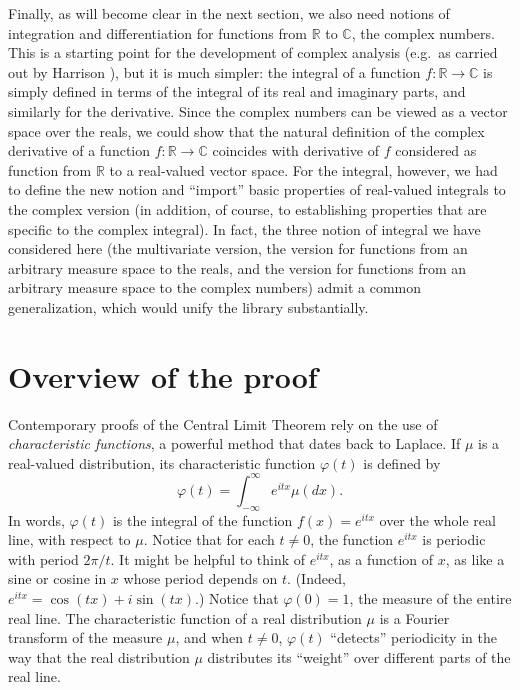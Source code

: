 \documentclass{article}
\newcommand{\RR}{\mathbb{R}}
\newcommand{\CC}{\mathbb{C}}
\newcommand{\ph}{\varphi}
\begin{document}
Finally, as will become clear in the next section, we also need notions of integration and differentiation for functions from $\RR$ to $\CC$, the complex numbers. This is a starting point for the development of complex analysis (e.g.~as carried out by Harrison \cite{harrison:07}), but it is much simpler: the integral of a function $f : \RR \to \CC$ is simply defined in terms of the integral of its real and imaginary parts, and similarly for the derivative. Since the complex numbers can be viewed as a vector space over the reals, we could show that the natural definition of the complex derivative of a function $f : \RR \to \CC$ coincides with derivative of $f$ considered as function from $\RR$ to a real-valued vector space. For the integral, however, we had to define the new notion and ``import'' basic properties of real-valued integrals to the complex version (in addition, of course, to establishing properties that are specific to the complex integral). In fact, the three notion of integral we have considered here (the multivariate version, the version for functions from an arbitrary measure space to the reals, and the version for functions from an arbitrary measure space to the complex numbers) admit a common generalization, which would unify the library substantially. 


\section{Overview of the proof}

Contemporary proofs of the Central Limit Theorem rely on the use of \emph{characteristic functions}, a powerful method that dates back to Laplace. If $\mu$ is a real-valued distribution, its characteristic function $\ph(t)$ is defined by
\[
\ph(t) = \int_{-\infty}^{\infty} e^{itx} \mu(dx).
\]
In words, $\ph(t)$ is the integral of the function $f(x) = e^{itx}$ over the whole real line, with respect to $\mu$. Notice that for each $t \neq 0$, the function $e^{itx}$ is periodic with period $2 \pi / t$. It might be helpful to think of $e^{itx}$, as a function of $x$, as like a sine or cosine in $x$ whose period depends on $t$. (Indeed, $e^{itx}= \cos (t x) + i \sin (t x)$.) Notice that $\ph(0) = 1$, the measure of the entire real line. The characteristic function of a real distribution $\mu$ is a Fourier transform of the measure $\mu$, and when $t \neq 0$, $\ph(t)$ ``detects'' periodicity in the way that the real distribution $\mu$ distributes its ``weight'' over different parts of the real line. 
\end{document}
